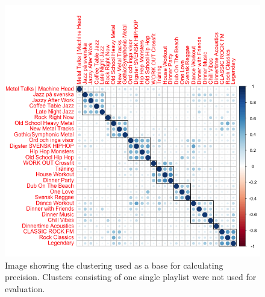 \documentclass[a4paper,11pt]{kth-mag}
\begin{document}
\begin{figure}
\includegraphics[scale=0.5]{images/sumAbsAgglHierClust-better.png}
\caption{Image showing the clustering used as a base for calculating precision. Clusters consisting of one single playlist were not used for evaluation.}
\label{sumAbsBetter}
\end{figure}
\end{document}
